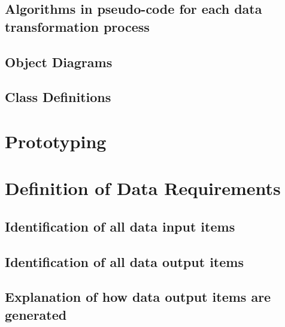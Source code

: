 \subsection{Algorithms in pseudo-code for each data transformation process}

\subsection{Object Diagrams}

\subsection{Class Definitions}

\section{Prototyping}

\section{Definition of Data Requirements}

\subsection{Identification of all data input items}

\subsection{Identification of all data output items}

\subsection{Explanation of how data output items are generated}

